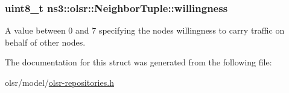 \subsubsection[{\texorpdfstring{willingness}{willingness}}]{\setlength{\rightskip}{0pt plus 5cm}uint8\+\_\+t ns3\+::olsr\+::\+Neighbor\+Tuple\+::willingness}\hypertarget{structns3_1_1olsr_1_1NeighborTuple_a96d469ddecd638d7eb524de3bcd79edf}{}\label{structns3_1_1olsr_1_1NeighborTuple_a96d469ddecd638d7eb524de3bcd79edf}


A value between 0 and 7 specifying the node\textquotesingle{}s willingness to carry traffic on behalf of other nodes. 



The documentation for this struct was generated from the following file\+:\begin{DoxyCompactItemize}
\item 
olsr/model/\hyperlink{olsr-repositories_8h}{olsr-\/repositories.\+h}\end{DoxyCompactItemize}
